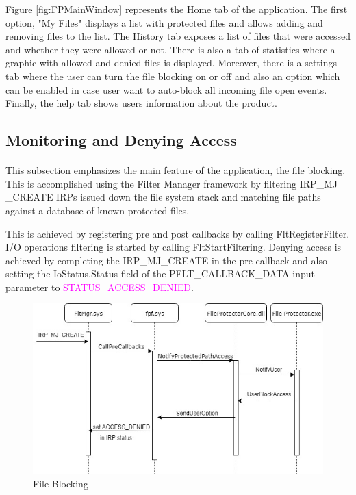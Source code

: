 		Figure \ref{fig:FPMainWindow} represents the Home tab of the application. The first option, "My Files" displays a list with protected files and allows adding and removing files to the list. The History tab exposes a list of files that were accessed and whether they were allowed or not. There is also a tab of statistics where a graphic with allowed and denied files is displayed. Moreover, there is a settings tab where the user can turn the file blocking on or off and also an option which can be enabled in case user want to auto-block all incoming file open events. Finally, the help tab shows users information about the product.
		
		\newpage
		\subsection{Monitoring and Denying Access}
		\paragraph{}
		This subsection emphasizes the main feature of the application, the file blocking. This is accomplished using the Filter Manager framework by filtering IRP\_MJ \_CREATE IRPs issued down the file system stack and matching file paths against a database of known protected files. 
		
		
		This is achieved by registering pre and post callbacks by calling FltRegisterFilter. I/O operations filtering is started by calling FltStartFiltering. Denying access is achieved by completing the IRP\_MJ\_CREATE in the pre callback and also setting the IoStatus.Status field of the \textcolor{Emerald} {PFLT\_CALLBACK\_DATA} input parameter to \textcolor{Magenta} {STATUS\_ACCESS\_DENIED}.
		
		\begin{figure}[h!]
			\begin{center}
				\includegraphics[scale=0.7]{images/SequenceDiagram.jpg}
				\caption{File Blocking}
				\label{fig:FPFBlockFileDiagram}
			\end{center}
		\end{figure}
	
